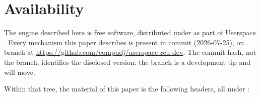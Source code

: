 \documentclass[11pt]{article}
\begin{document}
\section*{Availability}
\label{sec:availability}

The engine described here is free software, distributed under
 as part of Userspace \rcu. Every mechanism this paper
describes is present in commit
 (2026-07-25), on branch
 at \url{https://github.com/compudj/userspace-rcu-dev}. The
commit hash, not the branch, identifies the disclosed version: the branch is a
development tip and will move.

Within that tree, the material of this paper is the following headers, all under
:
\end{document}
